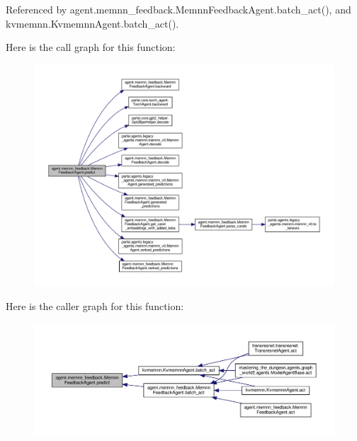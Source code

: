 Referenced by agent.\+memnn\+\_\+feedback.\+Memnn\+Feedback\+Agent.\+batch\+\_\+act(), and kvmemnn.\+Kvmemnn\+Agent.\+batch\+\_\+act().

Here is the call graph for this function\+:
\nopagebreak
\begin{figure}[H]
\begin{center}
\leavevmode
\includegraphics[width=350pt]{classagent_1_1memnn__feedback_1_1MemnnFeedbackAgent_a5adbaa50b1fb0a4f338912b6983461d6_cgraph}
\end{center}
\end{figure}
Here is the caller graph for this function\+:
\nopagebreak
\begin{figure}[H]
\begin{center}
\leavevmode
\includegraphics[width=350pt]{classagent_1_1memnn__feedback_1_1MemnnFeedbackAgent_a5adbaa50b1fb0a4f338912b6983461d6_icgraph}
\end{center}
\end{figure}
\mbox{\label{classagent_1_1memnn__feedback_1_1MemnnFeedbackAgent_a279d88f27de78da07c82a315b172f260}} 
